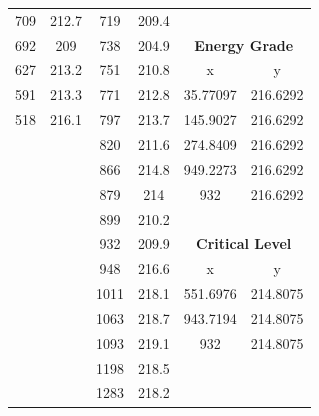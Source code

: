 \begin{center}
\begin{tabular}{|cc||cc||cc|}
    709      & 212.7                    & 719  & 209.4                         &          &                                    \\
    692      & 209                      & 738  & 204.9                         & \multicolumn{2}{c|}{\textbf{Energy Grade}}    \\ 
    \cline{5-6}
    627      & 213.2                    & 751  & 210.8                         & x        & y                                  \\
    591      & 213.3                    & 771  & 212.8                         & 35.77097 & 216.6292                           \\
    518      & 216.1                    & 797  & 213.7                         & 145.9027 & 216.6292                           \\
             &                          & 820  & 211.6                         & 274.8409 & 216.6292                           \\
             &                          & 866  & 214.8                         & 949.2273 & 216.6292                           \\
             &                          & 879  & 214                           & 932      & \multicolumn{1}{l|}{216.6292}      \\
             &                          & 899  & 210.2                         &          &                                    \\
             &                          & 932  & 209.9                         & \multicolumn{2}{c|}{\textbf{Critical Level}}  \\ 
    \cline{5-6}
             &                          & 948  & 216.6                         & x        & y                                  \\
             &                          & 1011 & 218.1                         & 551.6976 & 214.8075                           \\
             &                          & 1063 & 218.7                         & 943.7194 & 214.8075                           \\
             &                          & 1093 & 219.1                         & 932      & 214.8075                           \\
             &                          & 1198 & 218.5                         &          &                                    \\
             &                          & 1283 & 218.2                         &          &                                    \\

\end{tabular}
\end{center}
